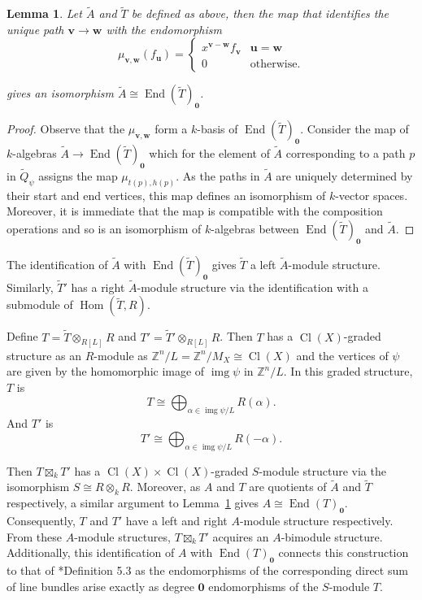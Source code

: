 \documentclass{amsart}
\newcommand{\ZZ}{\mathbb{Z}}
\newcommand{\field}{k}
\DeclareMathOperator{\Cl}{Cl}
\DeclareMathOperator{\Hom}{Hom}
\DeclareMathOperator{\End}{End}
\DeclareMathOperator{\img}{img}
\newtheorem{lemma}[theorem]{Lemma}
\theoremstyle{remark}
\begin{document}
\begin{lemma}
  \label{lem:T-end}
  Let $\widetilde{A}$ and $\widetilde{T}$ be defined as above, then the map that identifies the unique path $\bm{v}\rightarrow \bm{w}$ with the endomorphism \[
\mu_{\bm{v},\bm{w}}(f_{\bm{u}}) =
\begin{cases}
  x^{\bm{v}-\bm{w}}f_{\bm{v}} & \bm{u} = \bm{w}\\
  0 & \text{otherwise.}
\end{cases}
\]

gives an isomorphism $\widetilde{A}\cong \End(\widetilde{T})_{\bm{0}}$.
\end{lemma}
\begin{proof}
Observe that the $\mu_{\bm{v},\bm{w}}$ form a $\field$-basis of $\End(\widetilde{T})_{\bm{0}}$. Consider the map of $\field$-algebras $\widetilde{A}\rightarrow \End(\widetilde{T})_{\bm{0}}$ which for the element of $\widetilde{A}$ corresponding to a path $p$ in $\widetilde{Q}_\psi$ assigns the map $\mu_{t(p),h(p)}$. As the paths in $\widetilde{A}$ are uniquely determined by their start and end vertices, this map defines an isomorphism of $\field$-vector spaces. Moreover, it is immediate that the map is compatible with the composition operations and so is an isomorphism of $\field$-algebras between $\End(\widetilde{T})_{\bm{0}}$ and $\widetilde{A}$.
\end{proof}


The identification of $\widetilde{A}$ with $\End(\widetilde{T})_{\bm{0}}$ gives $\widetilde{T}$ a left $\widetilde{A}$-module structure. Similarly, $\widetilde{T}'$ has a right $\widetilde{A}$-module structure via the identification with a submodule of $\Hom(\widetilde{T},R)$.

Define $T=\widetilde{T}\otimes_{R[L]} R$ and $T'=\widetilde{T}'\otimes_{R[L]} R$. Then $T$ has a $\Cl(X)$-graded structure as an $R$-module as $\ZZ^n/L=\ZZ^n/M_X\cong \Cl(X)$ and the vertices of $\psi$ are given by the homomorphic image of $\img \psi$ in $\ZZ^n/L$. In this graded structure, $T$ is
\[T \cong \bigoplus_{\alpha \in \img\psi/L} R(\alpha).\]
And $T'$ is
\[T' \cong \bigoplus_{\alpha \in \img\psi/L} R(-\alpha).\]

Then $T\boxtimes_{\field} T'$ has a $\Cl(X)\times\Cl(X)$-graded $S$-module structure via the isomorphism $S\cong R\otimes_{\field} R$. Moreover, as $A$ and $T$ are quotients of $\widetilde{A}$ and $\widetilde{T}$ respectively, a similar argument to Lemma~\ref{lem:T-end} gives $A\cong \End(T)_{\bm{0}}$. Consequently, $T$ and $T'$ have a left and right $A$-module structure respectively. From these $A$-module structures, $T\boxtimes_{\field} T'$ acquires an $A$-bimodule structure. Additionally, this identification of $A$ with $\End(T)_{\bm{0}}$ connects this construction to that of \cite{FH25}*{Definition 5.3} as the endomorphisms of the corresponding direct sum of line bundles arise exactly as degree $\bm{0}$ endomorphisms of the $S$-module $T$.
\end{document}
